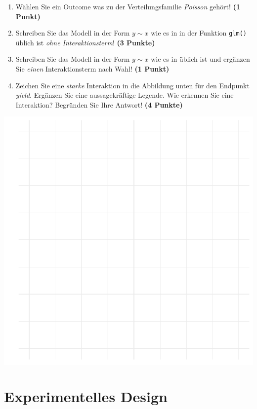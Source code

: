 \documentclass[a4paper, 9pt]{scrartcl}\usepackage[]{graphicx}\usepackage[]{xcolor}
\makeatletter
\def\maxwidth{ %
  \ifdim\Gin@nat@width>\linewidth
    \linewidth
  \else
    \Gin@nat@width
  \fi
}
\makeatother
\begin{document}
\begin{enumerate}
\item W{\"a}hlen Sie ein Outcome was zu der Verteilungsfamilie
  \textit{Poisson} geh{\"o}rt! \textbf{(1 Punkt)}
\item Schreiben Sie das Modell in der Form $y \sim x$ wie es in \Rlogo in
  der Funktion \texttt{glm()}
  {\"u}blich ist \textit{ohne Interaktionsterm}! \textbf{(3 Punkte)}
\item Schreiben Sie das Modell in der Form $y \sim x$ wie es in \Rlogo
  {\"u}blich ist und erg{\"a}nzen Sie \textit{einen} Interaktionsterm nach Wahl! \textbf{(1 Punkt)} 
\item Zeichen Sie eine \textit{starke}
  Interaktion in die Abbildung unten f{\"u}r den Endpunkt
  \textit{yield}. Erg{\"a}nzen Sie eine aussagekr{\"a}ftige Legende. Wie erkennen
  Sie eine Interaktion? Begr{\"u}nden Sie Ihre Antwort! \textbf{(4 Punkte)}
\end{enumerate}



{\centering \includegraphics[width=\maxwidth]{img/modeling-R-01-1} 

}


 
\clearpage
\part{Experimentelles Design}
\end{document}
